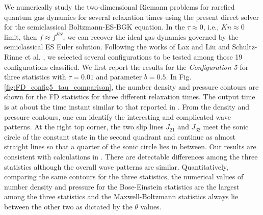 \documentclass[twoside,twocolumn,prc,floats,amsmath,amssymb]{revtex4} %
\begin{document}
We numerically study the two-dimensional Riemann problems for rarefied quantum gas dynamics for several relaxation times using the present direct solver for the semiclassical Boltzmann-ES-BGK equation.   In the $\tau \approx 0$, i.e.,  $Kn \approx 0$ limit, then $f \approx f^{ES}$, we can recover the ideal gas dynamics governed by the semiclassical ES Euler solution.  Following the works of Lax and Liu \cite{Laxliu95} and Schultz-Rinne et al. \cite{Rinne1993},  we selected several configurations to be tested among those 19 configurations classified.  We first report the results for the \emph{Configuration 5} for three statistics with $\tau=0.01$ and parameter $b=0.5$. In Fig. \ref{fig:FD_config5_tau_comparison}, the number density and pressure contours are shown for the FD statistics for three different relaxation times.  The output time is at about the time instant similar to that reported in \cite{Laxliu1995}\cite{Rinne1993}.  From the density and pressure contours, one can identify the interesting and complicated wave patterns.   At the right top corner, the two slip lines $J_{21}$ and $J_{32}$ meet the sonic circle of the constant state in the second quadrant and continue as almost straight lines so that a quarter of the sonic circle lies in between.  Our results are consistent with calculations in \cite{Laxliu1995}\cite{Rinne1993}.  There are detectable differences among the three statistics although the overall wave patterns are similar. Quantitatively, comparing the same contours for the three statistics, the numerical values of number density and pressure for the Bose-Einstein statistics are the largest among the three statistics and the Maxwell-Boltzmann statistics always lie between the other two as dictated by the $\theta$ values.
\end{document}
